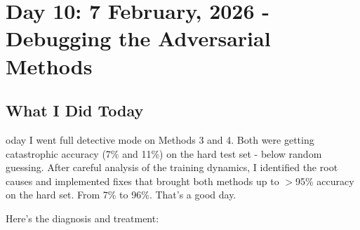 \documentclass[9pt,a4paper,twocolumn,twoside]{tau-class/tau}
\begin{document}

\section{Day 10: 7 February, 2026 - Debugging the Adversarial Methods}

    \subsection{What I Did Today}

        oday I went full detective mode on Methods 3 and 4. Both were getting catastrophic accuracy (7\% and 11\%) on the hard test set - below random guessing. After careful analysis of the training dynamics, I identified the root causes and implemented fixes that brought both methods up to $>$95\% accuracy on the hard set. From 7\% to 96\%. That's a good day.

        Here's the diagnosis and treatment:
\end{document}
